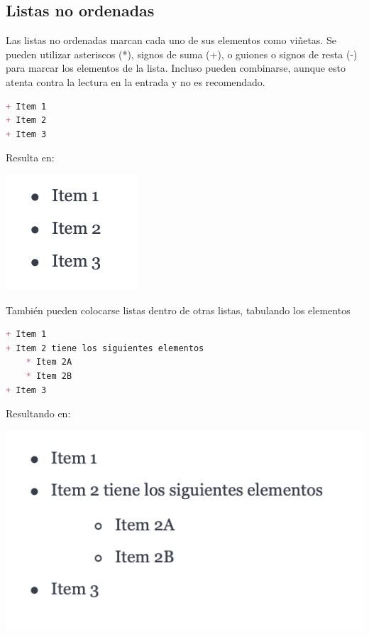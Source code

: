 \subsection*{Listas no ordenadas}

Las listas no ordenadas marcan cada uno de sus elementos como viñetas.
Se pueden utilizar asteriscos (*), signos de suma (+), o guiones o signos
de resta (-) para marcar los elementos de la lista. Incluso pueden combinarse,
aunque esto atenta contra la lectura en la entrada y no es recomendado.

\begin{lstlisting}[language=Markdown,otherkeywords={+},morekeywords={[2]{+}}]
+ Item 1
+ Item 2
+ Item 3
\end{lstlisting}

Resulta en:

\includegraphics[]{anexos/1_lenguajes_marcado/1_markdown/imagenes/md_ulist_1.png}

También pueden colocarse listas dentro de otras listas, tabulando los
elementos

\begin{lstlisting}[language=Markdown,otherkeywords={+},morekeywords={[2]{+}}]
+ Item 1
+ Item 2 tiene los siguientes elementos
    * Item 2A
    * Item 2B
+ Item 3
\end{lstlisting}

Resultando en:

\includegraphics[]{anexos/1_lenguajes_marcado/1_markdown/imagenes/md_ulist_2.png}

